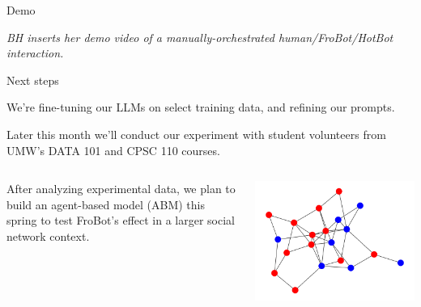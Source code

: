\documentclass[12pt]{beamer}
\begin{document}
\begin{frame}[c]{Demo}

\textit{BH inserts her demo video of a manually-orchestrated human/FroBot/HotBot interaction.}

\end{frame}
\begin{frame}[c]{Next steps}

We're fine-tuning our LLMs on select training data, and refining our prompts.

\pause
Later this month we'll conduct our experiment with student volunteers from UMW's DATA 101 and CPSC 110 courses.
\pause


\begin{columns}[c,onlytextwidth]
  \begin{column}{0.6\textwidth}
After analyzing experimental data, we plan to build an agent-based model (ABM) this spring to test FroBot's effect in a larger social network context.
  \end{column}
  \begin{column}{0.4\textwidth}
    \includegraphics[width=\linewidth]{agraph.png}
  \end{column}
\end{columns}

\end{frame}
\end{document}
